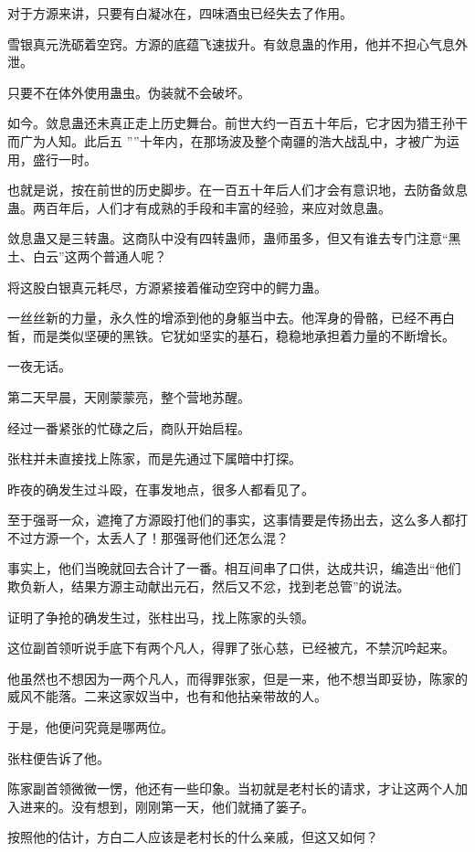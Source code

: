 \begin{this_body}
对于方源来讲，只要有白凝冰在，四味酒虫已经失去了作用。

雪银真元洗砺着空窍。方源的底蕴飞速拔升。有敛息蛊的作用，他并不担心气息外泄。

只要不在体外使用蛊虫。伪装就不会破坏。

如今。敛息蛊还未真正走上历史舞台。前世大约一百五十年后，它才因为猎王孙干而广为人知。此后五 ””十年内，在那场波及整个南疆的浩大战乱中，才被广为运用，盛行一时。

也就是说，按在前世的历史脚步。在一百五十年后人们才会有意识地，去防备敛息蛊。两百年后，人们才有成熟的手段和丰富的经验，来应对敛息蛊。

敛息蛊又是三转蛊。这商队中没有四转蛊师，蛊师虽多，但又有谁去专门注意“黑土、白云”这两个普通人呢？

将这股白银真元耗尽，方源紧接着催动空窍中的鳄力蛊。

一丝丝新的力量，永久性的增添到他的身躯当中去。他浑身的骨骼，已经不再白皙，而是类似坚硬的黑铁。它犹如坚实的基石，稳稳地承担着力量的不断增长。

一夜无话。

第二天早晨，天刚蒙蒙亮，整个营地苏醒。

经过一番紧张的忙碌之后，商队开始启程。

张柱并未直接找上陈家，而是先通过下属暗中打探。

昨夜的确发生过斗殴，在事发地点，很多人都看见了。

至于强哥一众，遮掩了方源殴打他们的事实，这事情要是传扬出去，这么多人都打不过方源一个，太丢人了！那强哥他们还怎么混？

事实上，他们当晚就回去合计了一番。相互间串了口供，达成共识，编造出“他们欺负新人，结果方源主动献出元石，然后又不忿，找到老总管”的说法。

证明了争抢的确发生过，张柱出马，找上陈家的头领。

这位副首领听说手底下有两个凡人，得罪了张心慈，已经被亢，不禁沉吟起来。

他虽然也不想因为一两个凡人，而得罪张家，但是一来，他不想当即妥协，陈家的威风不能落。二来这家奴当中，也有和他拈亲带故的人。

于是，他便问究竟是哪两位。

张柱便告诉了他。

陈家副首领微微一愣，他还有一些印象。当初就是老村长的请求，才让这两个人加入进来的。没有想到，刚刚第一天，他们就捅了篓子。

按照他的估计，方白二人应该是老村长的什么亲戚，但这又如何？


\end{this_body}
